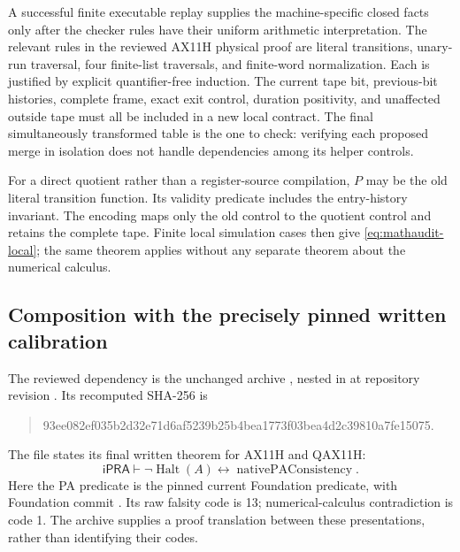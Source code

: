 A successful finite executable replay supplies the machine-specific
closed facts only after the checker rules have their uniform arithmetic
interpretation.  The relevant rules in the reviewed AX11H physical proof
are literal transitions, unary-run traversal, four finite-list
traversals, and finite-word normalization.  Each is justified by explicit
quantifier-free induction.  The current tape bit, previous-bit histories,
complete frame, exact exit control, duration positivity, and unaffected
outside tape must all be included in a new local contract.  The final
simultaneously transformed table is the one to check: verifying each
proposed merge in isolation does not handle dependencies among its
helper controls.

For a direct quotient rather than a register-source compilation, $P$ may
be the old literal transition function.  Its validity predicate includes
the entry-history invariant.  The encoding maps only the old control to
the quotient control and retains the complete tape.  Finite local
simulation cases then give \eqref{eq:mathaudit-local}; the same theorem
applies without any separate theorem about the numerical calculus.

\subsection{Composition with the precisely pinned written calibration}

The reviewed dependency is the unchanged archive
\texttt{}, nested in
\texttt{}
at repository revision
\texttt{}.
Its recomputed SHA-256 is
\begin{quote}\small\ttfamily
93ee082ef035b2d32e71d6af5239b25b4bea1773f03bea4d2c39810a7fe15075.
\end{quote}
The file \texttt{} states
its final written theorem for AX11H and QAX11H:
\[
 \mathsf{iPRA}\vdash
 \neg\operatorname{Halt}(A)\longleftrightarrow
 \operatorname{nativePAConsistency}.
 \tag{C}\label{eq:mathaudit-calibration}
\]
Here the PA predicate is the pinned current Foundation predicate, with
Foundation commit
\texttt{}.
Its raw falsity code is 13; numerical-calculus contradiction is code 1.
The archive supplies a proof translation between these presentations,
rather than identifying their codes.

